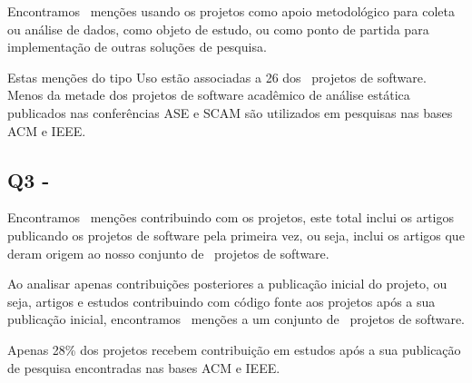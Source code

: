 Encontramos \UseCount \ menções usando os projetos como apoio metodológico para
coleta ou análise de dados, como objeto de estudo, ou como ponto de partida
para implementação de outras soluções de pesquisa.

Estas menções do tipo Uso estão associadas a 26 dos \SoftwareCount \ projetos
de software.  Menos da metade dos projetos de software acadêmico de análise
estática publicados nas conferências ASE e SCAM são utilizados em pesquisas nas
bases ACM e IEEE.

\subsection{Q3 - \EstudoDoisQuestaoTres}

Encontramos \ContributeCount \ menções contribuindo com os projetos,
este total inclui os artigos publicando os projetos de software pela
primeira vez, ou seja, inclui os artigos que deram origem ao nosso
conjunto de \SoftwareCount \ projetos de software.

Ao analisar apenas contribuições posteriores a publicação inicial
do projeto, ou seja, artigos e estudos contribuindo com código
fonte aos projetos após a sua publicação inicial, encontramos
\ContributeStudyDoisCount \ menções a um conjunto de
\ContributeStudyDoisSoftware \ projetos de software.

Apenas 28\% dos projetos recebem contribuição em estudos após a sua
publicação de pesquisa encontradas nas bases ACM e IEEE.




%


